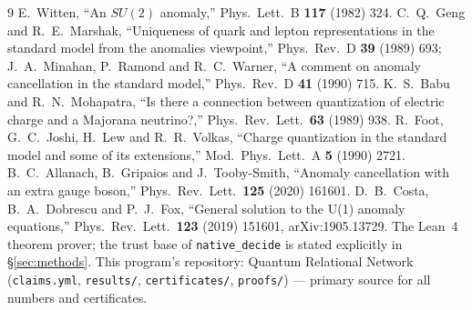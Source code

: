 \documentclass[aps,prd,preprint,nofootinbib]{revtex4-2}
\begin{document}
\begin{thebibliography}{9}
 E.~Witten, ``An $SU(2)$ anomaly,'' Phys.\ Lett.\ B \textbf{117} (1982) 324.
 C.~Q.~Geng and R.~E.~Marshak, ``Uniqueness of quark and lepton representations in the standard model from the anomalies viewpoint,'' Phys.\ Rev.\ D \textbf{39} (1989) 693; J.~A.~Minahan, P.~Ramond and R.~C.~Warner, ``A comment on anomaly cancellation in the standard model,'' Phys.\ Rev.\ D \textbf{41} (1990) 715.
 K.~S.~Babu and R.~N.~Mohapatra, ``Is there a connection between quantization of electric charge and a Majorana neutrino?,'' Phys.\ Rev.\ Lett.\ \textbf{63} (1989) 938.
 R.~Foot, G.~C.~Joshi, H.~Lew and R.~R.~Volkas, ``Charge quantization in the standard model and some of its extensions,'' Mod.\ Phys.\ Lett.\ A \textbf{5} (1990) 2721.
 B.~C.~Allanach, B.~Gripaios and J.~Tooby-Smith, ``Anomaly cancellation with an extra gauge boson,'' Phys.\ Rev.\ Lett.\ \textbf{125} (2020) 161601.
 D.~B.~Costa, B.~A.~Dobrescu and P.~J.~Fox, ``General solution to the U(1) anomaly equations,'' Phys.\ Rev.\ Lett.\ \textbf{123} (2019) 151601, arXiv:1905.13729.
 The Lean~4 theorem prover; the trust base of \texttt{native\_decide} is stated explicitly in \S\ref{sec:methods}.
 This program's repository: Quantum Relational Network (\texttt{claims.yml}, \texttt{results/}, \texttt{certificates/}, \texttt{proofs/}) --- primary source for all numbers and certificates.
\end{thebibliography}
\end{document}
